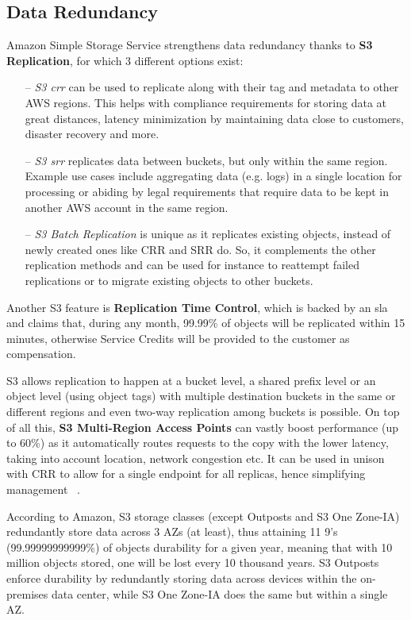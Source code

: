 \subsection{Data Redundancy}
Amazon Simple Storage Service strengthens data redundancy thanks to \textbf{S3 Replication}, for which 3 different options exist: ~\cite{s3replication}
\begin{itemize}
    \item [--] \textit{S3 \ac{crr}} can be used to replicate along with their tag and metadata to other AWS regions. This helps with compliance requirements for storing data at great distances, latency minimization by maintaining data close to customers, disaster recovery and more.

    \item [--] \textit{S3 \ac{srr}} replicates data between buckets, but only within the same region. Example use cases include aggregating data (e.g. logs) in a single location for processing or abiding by legal requirements that require data to be kept in another AWS account in the same region.

    \item [--] \textit{S3 Batch Replication} is unique as it replicates existing objects, instead of newly created ones like CRR and SRR do. So, it complements the other replication methods and can be used for instance to reattempt failed replications or to migrate existing objects to other buckets.
\end{itemize}

Another S3 feature is \textbf{Replication Time Control}, which is backed by an \ac{sla} and claims that, during any month, 99.99\% of objects will be replicated within 15 minutes, otherwise Service Credits will be provided to the customer as compensation.~\cite{s3replicationsla}

S3 allows replication to happen at a bucket level, a shared prefix level or an object level (using object tags) with multiple destination buckets in the same or different regions and even two-way replication among buckets is possible. On top of all this, \textbf{S3 Multi-Region Access Points} can vastly boost performance (up to 60\%) as it automatically routes requests to the copy with the lower latency, taking into account location,  network congestion etc. It can be used in unison with CRR to allow for a single endpoint for all replicas, hence simplifying management ~\cite{s3replication}.

According to Amazon, S3 storage classes (except Outposts and S3 One Zone-IA) redundantly store data across 3 AZs (at least), thus attaining 11 9's (99.99999999999\%) of objects durability for a given year, meaning that with 10 million objects stored, one will be lost every 10 thousand years. S3 Outposts enforce durability by redundantly storing data across devices within the on-premises data center, while S3 One Zone-IA does the same but within a single AZ.


